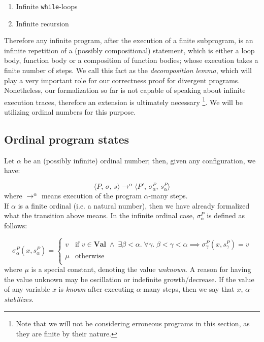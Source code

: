 \documentclass{article}
\begin{document}
\begin{enumerate}
    \item Infinite \texttt{while}-loops
    \item Infinite recursion
\end{enumerate}

Therefore any infinite program, after the execution of a finite subprogram, is an infinite repetition of a (possibly compositional) statement, which is either a loop body, function body or a composition of function bodies; whose execution takes a finite number of steps. We call this fact as the \textit{decomposition lemma}, which will play a very important role for our correctness proof for divergent programs. Nonetheless, our formalization so far is not capable of speaking about infinite execution traces, therefore an extension is ultimately necessary \footnote{Note that we will not be considering erroneous programs in this section, as they are finite by their nature.}. We will be utilizing ordinal numbers for this purpose.\\

\subsection{Ordinal program states}

Let $\alpha$ be an (possibly infinite) ordinal number; then, given any configuration, we have:

\[
\langle P,\, \sigma,\, s \rangle \rightarrow^\alpha \langle P',\, \sigma^P_\alpha,\, s^P_\alpha \rangle
\] where $\rightarrow^\alpha$ means execution of the program $\alpha$-many steps. \\

If $\alpha$ is a finite ordinal (i.e. a natural number), then we have already formalized what the transition above means. In the infinite ordinal case, $\sigma^P_\alpha$ is defined as follows:

\[
\sigma^P_\alpha(x, s^P_\alpha)  = 
\begin{cases}
    v & \text{if $v \in \textbf{Val} \;\land\; \exists \beta < \alpha .\; \forall \gamma .\; \beta < \gamma < \alpha \implies \sigma^P_\gamma(x, s^P_\gamma) = v$} \\
    \mu & \text{otherwise} \\
\end{cases}
\] where $\mu$ is a special constant, denoting the value \textit{unknown}. A reason for having the value unknown may be oscillation or indefinite growth/decrease. If the value of any variable $x$ is \textit{known} after executing $\alpha$-many steps, then we say that $x$, \textit{$\alpha$-stabilizes}. \\
\end{document}
